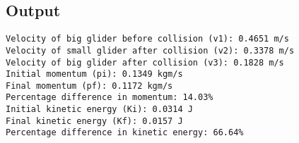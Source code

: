 \documentclass[a4paper,11pt]{article}
\begin{document}
\subsection*{Output}
\begin{lstlisting}
Velocity of big glider before collision (v1): 0.4651 m/s
Velocity of small glider after collision (v2): 0.3378 m/s
Velocity of big glider after collision (v3): 0.1828 m/s
Initial momentum (pi): 0.1349 kgm/s
Final momentum (pf): 0.1172 kgm/s
Percentage difference in momentum: 14.03%
Initial kinetic energy (Ki): 0.0314 J
Final kinetic energy (Kf): 0.0157 J
Percentage difference in kinetic energy: 66.64%
\end{lstlisting}
\end{document}
